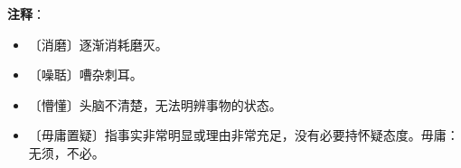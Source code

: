 \documentclass[12pt,UTF-8,openany]{ctexbook}
\begin{document}
\newpage

\textbf{注释}：

\vspace{-1em}

\begin{itemize}
    \setlength\itemsep{-0.2em}
    \item 〔消磨〕逐渐消耗磨灭。
    \item 〔噪聒〕嘈杂刺耳。
    \item 〔懵懂〕头脑不清楚，无法明辨事物的状态。
    \item 〔毋庸置疑〕指事实非常明显或理由非常充足，没有必要持怀疑态度。毋庸：无须，不必。
\end{itemize}
\end{document}
